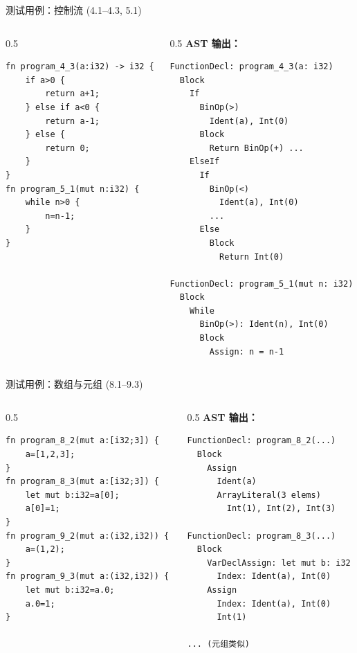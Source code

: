\documentclass[aspectratio=169]{ctexbeamer}
\begin{document}
\begin{frame}{测试用例：控制流 (4.1--4.3, 5.1)}
\begin{columns}[T]
\begin{column}{0.5\textwidth}
\begin{lstlisting}[language=RustLike, basicstyle=\tiny\ttfamily]
fn program_4_3(a:i32) -> i32 {
    if a>0 {
        return a+1;
    } else if a<0 {
        return a-1;
    } else {
        return 0;
    }
}
fn program_5_1(mut n:i32) {
    while n>0 {
        n=n-1;
    }
}
\end{lstlisting}
\end{column}
\begin{column}{0.5\textwidth}
\textbf{AST 输出：}
\begin{lstlisting}[basicstyle=\tiny\ttfamily,numbers=none]
FunctionDecl: program_4_3(a: i32)
  Block
    If
      BinOp(>)
        Ident(a), Int(0)
      Block
        Return BinOp(+) ...
    ElseIf
      If
        BinOp(<)
          Ident(a), Int(0)
        ...
      Else
        Block
          Return Int(0)

FunctionDecl: program_5_1(mut n: i32)
  Block
    While
      BinOp(>): Ident(n), Int(0)
      Block
        Assign: n = n-1
\end{lstlisting}
\end{column}
\end{columns}
\end{frame}

\begin{frame}[fragile]{测试用例：数组与元组 (8.1--9.3)}
\begin{columns}[T]
\begin{column}{0.5\textwidth}
\begin{lstlisting}[language=RustLike, basicstyle=\tiny\ttfamily]
fn program_8_2(mut a:[i32;3]) {
    a=[1,2,3];
}
fn program_8_3(mut a:[i32;3]) {
    let mut b:i32=a[0];
    a[0]=1;
}
fn program_9_2(mut a:(i32,i32)) {
    a=(1,2);
}
fn program_9_3(mut a:(i32,i32)) {
    let mut b:i32=a.0;
    a.0=1;
}
\end{lstlisting}
\end{column}
\begin{column}{0.5\textwidth}
\textbf{AST 输出：}
\begin{lstlisting}[basicstyle=\tiny\ttfamily,numbers=none]
FunctionDecl: program_8_2(...)
  Block
    Assign
      Ident(a)
      ArrayLiteral(3 elems)
        Int(1), Int(2), Int(3)

FunctionDecl: program_8_3(...)
  Block
    VarDeclAssign: let mut b: i32
      Index: Ident(a), Int(0)
    Assign
      Index: Ident(a), Int(0)
      Int(1)

... (元组类似)
\end{lstlisting}
\end{column}
\end{columns}
\end{frame}
\end{document}
